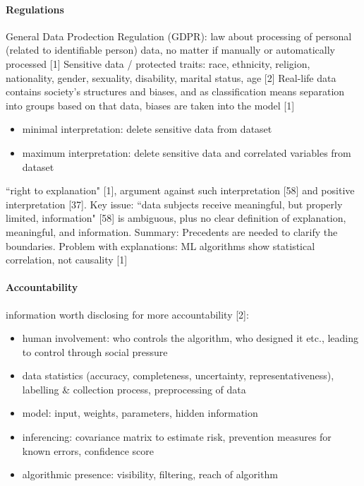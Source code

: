 \paragraph{Regulations}
General Data Prodection Regulation (GDPR): law about processing of personal (related to identifiable person) data, no matter if manually or automatically processed [1] \newline
Sensitive data / protected traits: race, ethnicity, religion, nationality, gender, sexuality, disability, marital status, age [2] \newline
Real-life data contains society's structures and biases, and as classification means separation into groups based on that data, biases are taken into the model [1] \newline
\begin{itemize}
	\item minimal interpretation: delete sensitive data from dataset
	\item maximum interpretation: delete sensitive data and correlated variables from dataset
\end{itemize}
``right to explanation" [1], argument against such interpretation [58] and positive interpretation [37]. Key issue: ``data subjects receive meaningful, but properly limited, information" [58] is ambiguous, plus no clear definition of explanation, meaningful, and information. Summary: Precedents are needed to clarify the boundaries.\newline
Problem with explanations: ML algorithms show statistical correlation, not causality [1]\newline


\paragraph{Accountability}
information worth disclosing for more accountability [2]:
\begin{itemize}
	\item human involvement: who controls the algorithm, who designed it etc., leading to control through social pressure
	\item data statistics (accuracy, completeness, uncertainty, representativeness), labelling \& collection process, preprocessing of data
	\item model: input, weights, parameters, hidden information
	\item inferencing: covariance matrix to estimate risk, prevention measures for known errors, confidence score 
	\item algorithmic presence: visibility, filtering, reach of algorithm
\end{itemize}

